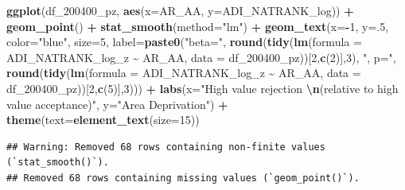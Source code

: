 \documentclass[
]{article}
\newenvironment{Shaded}{\begin{snugshade}}{\end{snugshade}}
\newcommand{\AttributeTok}[1]{\textcolor[rgb]{0.13,0.29,0.53}{#1}}
\newcommand{\DecValTok}[1]{\textcolor[rgb]{0.00,0.00,0.81}{#1}}
\newcommand{\FunctionTok}[1]{\textcolor[rgb]{0.13,0.29,0.53}{\textbf{#1}}}
\newcommand{\NormalTok}[1]{#1}
\newcommand{\SpecialCharTok}[1]{\textcolor[rgb]{0.81,0.36,0.00}{\textbf{#1}}}
\newcommand{\StringTok}[1]{\textcolor[rgb]{0.31,0.60,0.02}{#1}}
\begin{document}
\begin{Shaded}
\begin{Highlighting}[]
\FunctionTok{ggplot}\NormalTok{(df\_200400\_pz, }\FunctionTok{aes}\NormalTok{(}\AttributeTok{x=}\NormalTok{AR\_AA, }\AttributeTok{y=}\NormalTok{ADI\_NATRANK\_log)) }\SpecialCharTok{+}
  \FunctionTok{geom\_point}\NormalTok{() }\SpecialCharTok{+}
  \FunctionTok{stat\_smooth}\NormalTok{(}\AttributeTok{method=}\StringTok{"lm"}\NormalTok{) }\SpecialCharTok{+}
  \FunctionTok{geom\_text}\NormalTok{(}\AttributeTok{x=}\SpecialCharTok{{-}}\DecValTok{1}\NormalTok{, }\AttributeTok{y=}\NormalTok{.}\DecValTok{5}\NormalTok{, }\AttributeTok{color=}\StringTok{"blue"}\NormalTok{, }\AttributeTok{size=}\DecValTok{5}\NormalTok{, }\AttributeTok{label=}\FunctionTok{paste0}\NormalTok{(}\StringTok{"beta="}\NormalTok{,}
       \FunctionTok{round}\NormalTok{(}\FunctionTok{tidy}\NormalTok{(}\FunctionTok{lm}\NormalTok{(}\AttributeTok{formula =}\NormalTok{ ADI\_NATRANK\_log\_z }\SpecialCharTok{\textasciitilde{}}\NormalTok{ AR\_AA, }\AttributeTok{data =}\NormalTok{ df\_200400\_pz))[}\DecValTok{2}\NormalTok{,}\FunctionTok{c}\NormalTok{(}\DecValTok{2}\NormalTok{)],}\DecValTok{3}\NormalTok{),}
       \StringTok{", p="}\NormalTok{, }
       \FunctionTok{round}\NormalTok{(}\FunctionTok{tidy}\NormalTok{(}\FunctionTok{lm}\NormalTok{(}\AttributeTok{formula =}\NormalTok{ ADI\_NATRANK\_log\_z }\SpecialCharTok{\textasciitilde{}}\NormalTok{ AR\_AA, }\AttributeTok{data =}\NormalTok{ df\_200400\_pz))[}\DecValTok{2}\NormalTok{,}\FunctionTok{c}\NormalTok{(}\DecValTok{5}\NormalTok{)],}\DecValTok{3}\NormalTok{))) }\SpecialCharTok{+}
    \FunctionTok{labs}\NormalTok{(}\AttributeTok{x=}\StringTok{"High value rejection }\SpecialCharTok{\textbackslash{}n}\StringTok{(relative to high value acceptance)"}\NormalTok{,}
       \AttributeTok{y=}\StringTok{"Area Deprivation"}\NormalTok{) }\SpecialCharTok{+}
  \FunctionTok{theme}\NormalTok{(}\AttributeTok{text=}\FunctionTok{element\_text}\NormalTok{(}\AttributeTok{size=}\DecValTok{15}\NormalTok{))}
\end{Highlighting}
\end{Shaded}

\begin{verbatim}
## Warning: Removed 68 rows containing non-finite values (`stat_smooth()`).
## Removed 68 rows containing missing values (`geom_point()`).
\end{verbatim}
\end{document}
